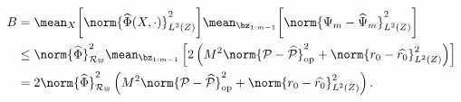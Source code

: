 \begin{itemize}
        \begin{align*}
            B &= \mean_{ X } \bigg[
                \norm{ \hat{ \Phi } ( X, \cdot ) }_{ L^2 ( Z ) }^2
            \bigg]
            \mean_{ \bz_{ 1:m-1 } } \bigg[
                    \norm{ \Psi_{ m } - \hat{ \Psi }_{ m } }_{ L^2 ( Z ) }^2
            \bigg] \\
            &\leq \norm{ \hat{ \Phi } }_{ \mathcal{R}_{ \mathbb{W} } }^2
            \mean_{ \bz_{ 1:m-1 } } \left[
                2 \left(
                    M^2 \norm{ \meanop - \hat{ \meanop } }_{ \mathrm{op} }^2
                    + \norm{
                        r_{ 0 } - \hat{ r_{ 0 } }
                    }_{ L^{ 2 } ( Z ) }^2
                \right)
            \right] \\
            &= 2 \norm{ \hat{ \Phi } }_{ \mathcal{R}_{ \mathbb{W} } }^2
            \left(
                M^2 \norm{ \meanop - \hat{ \meanop } }_{ \mathrm{op} }^2
                + \norm{ r_{ 0 } - \hat{ r_{ 0 } } }_{ L^{ 2 } ( Z ) }^2
            \right)
        .\end{align*}
\end{itemize}

